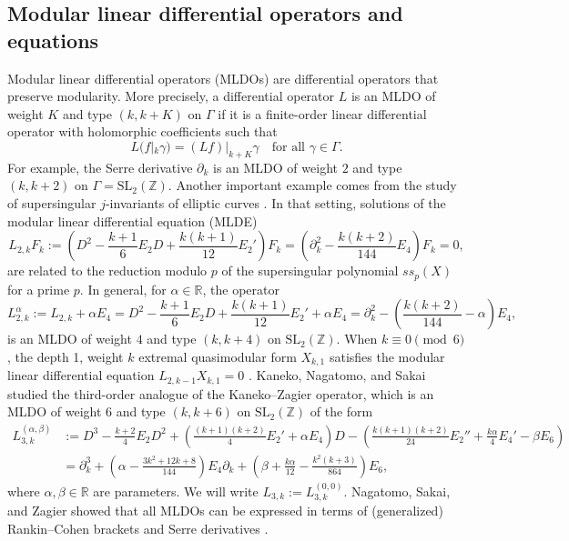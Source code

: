 \documentclass[10pt,reqno]{amsproc}
\newcommand{\SL}{\mathrm{SL}}
\newcommand{\bR}{\mathbb{R}}
\newcommand{\bZ}{\mathbb{Z}}
\newcommand{\1}{\mathds{1}}	%
\theoremstyle{definition}
\theoremstyle{remark}
\begin{document}
\subsection{Modular linear differential operators and equations}

Modular linear differential operators (MLDOs) are differential operators that preserve modularity.
More precisely, a differential operator $L$ is an MLDO of weight $K$ and type $(k,k+K)$ on $\Gamma$ if it is a finite-order linear differential operator with holomorphic coefficients such that
\[
    L(f|_k \gamma) = (Lf)|_{k+K} \gamma \quad \text{for all } \gamma \in \Gamma.
\]
For example, the Serre derivative $\partial_k$ is an MLDO of weight $2$ and type $(k,k+2)$ on $\Gamma = \SL_2(\bZ)$.
Another important example comes from the study of supersingular $j$-invariants of elliptic curves \cite{kaneko1998supersingular}. In that setting, solutions of the modular linear differential equation (MLDE)
\[
    L_{2,k} F_k := \left(D^2 - \frac{k+1}{6} E_2 D + \frac{k(k+1)}{12}E_2'\right) F_k = \left(\partial_k^2 - \frac{k(k+2)}{144}E_4\right) F_k = 0,
\]
are related to the reduction modulo $p$ of the supersingular polynomial $ss_p(X)$ for a prime $p$.
In general, for $\alpha \in \bR$, the operator
\begin{equation}
    \label{eqn:KZ2_def}
    L_{2,k}^{\alpha} := L_{2,k} + \alpha E_4 = D^2 - \frac{k+1}{6} E_2 D + \frac{k(k+1)}{12}E_2' + \alpha E_4 = \partial_k^2 - \left(\frac{k(k+2)}{144} - \alpha\right) E_4,
\end{equation}
is an MLDO of weight $4$ and type $(k,k+4)$ on $\SL_2(\bZ)$.
When $k \equiv 0 \pmod{6}$, the depth 1, weight $k$ extremal quasimodular form $X_{k,1}$ satisfies the modular linear differential equation $L_{2,k-1} X_{k,1} = 0$ \cite{kaneko2006extremal,grabner2020quasimodular}.
Kaneko, Nagatomo, and Sakai \cite{kaneko2017third} studied the third-order analogue of the Kaneko--Zagier operator, which is an MLDO of weight $6$ and type $(k,k+6)$ on $\SL_2(\bZ)$ of the form
\begin{align}
    L_{3,k}^{(\alpha,\beta)} &:= D^3 - \frac{k+2}{4} E_2 D^2 + \left(\frac{(k+1)(k+2)}{4}E_2' + \alpha E_4\right) D - \left(\frac{k(k+1)(k+2)}{24}E_2'' + \frac{k\alpha}{4} E_4' - \beta E_6\right) \label{eqn:KZ3_def} \\
    &= \partial_k^3 + \left(\alpha - \frac{3k^2 + 12k + 8}{144}\right) E_4 \partial_k + \left(\beta + \frac{k\alpha}{12} - \frac{k^2(k+3)}{864}\right) E_6, \label{eqn:KZ3_def_serre}
\end{align}
where $\alpha, \beta \in \bR$ are parameters.
We will write $L_{3,k} := L_{3,k}^{(0,0)}$.
Nagatomo, Sakai, and Zagier showed that all MLDOs can be expressed in terms of (generalized) Rankin--Cohen brackets and Serre derivatives \cite{nagatomo2024modular}.
\end{document}
